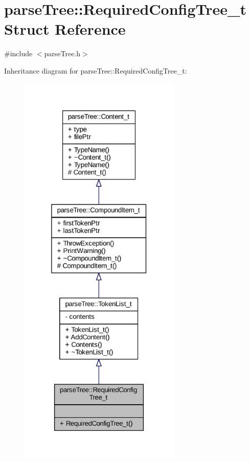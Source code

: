 \hypertarget{structparse_tree_1_1_required_config_tree__t}{}\section{parse\+Tree\+:\+:Required\+Config\+Tree\+\_\+t Struct Reference}
\label{structparse_tree_1_1_required_config_tree__t}


{\ttfamily \#include $<$parse\+Tree.\+h$>$}



Inheritance diagram for parse\+Tree\+:\+:Required\+Config\+Tree\+\_\+t\+:
\nopagebreak
\begin{figure}[H]
\begin{center}
\leavevmode
\includegraphics[height=550pt]{structparse_tree_1_1_required_config_tree__t__inherit__graph}
\end{center}
\end{figure}


